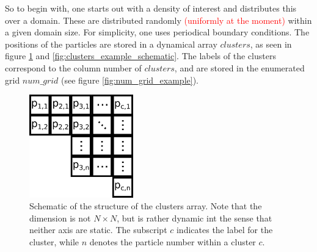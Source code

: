So to begin with, one starts out with a density of interest and distributes this over a domain. These are distributed randomly \textcolor{red}{(uniformly at the moment)} within a given domain size. For simplicity, one uses periodical boundary conditions. The positions of the particles are stored in a dynamical array $clusters$, as seen in figure \ref{fig:clusters_schematics} and \ref{fig:clusters_example_schematic}. The labels of the clusters correspond to the column number of $clusters$, and are stored in the enumerated grid $num\_grid$ (see figure \ref{fig:num_grid_example}). 


\begin{figure}[h]
	\begin{center}
		\includegraphics[width = 0.4\textwidth]{fig/clusters_schematics.png}
		\caption{Schematic of the structure of the clusters array. Note that the dimension is not $N \times N$, but is rather dynamic int the sense that neither axis are static. The subscript $c$ indicates the label for the cluster, while $n$ denotes the particle number within a cluster $c$.}
		\label{fig:clusters_schematics}
	\end{center}
\end{figure}

